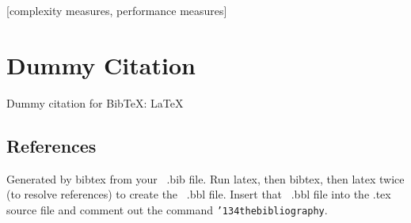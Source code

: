 \documentclass{acm_proc_article-sp}
\begin{document}
\maketitle
\begin{abstract}

\end{abstract}

[complexity measures, performance measures]










\section{Dummy Citation}
Dummy citation for Bib\TeX:
\LaTeX\cite{Lamport:LaTeX}


%



\subsection{References}
Generated by bibtex from your ~.bib file.  Run latex,
then bibtex, then latex twice (to resolve references)
to create the ~.bbl file.  Insert that ~.bbl file into
the .tex source file and comment out
the command \texttt{{\char'134}thebibliography}.

\balancecolumns
\end{document}
